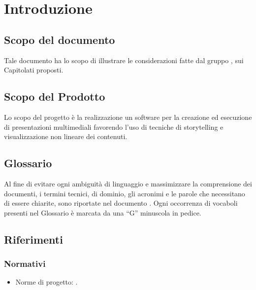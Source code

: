 \section{Introduzione}{
	\subsection{Scopo del documento}{
		Tale documento ha lo scopo di illustrare le considerazioni fatte dal gruppo \gruppo, sui Capitolati proposti.
	}
	\subsection{Scopo del Prodotto}{
		Lo scopo del progetto è la realizzazione un software per la creazione ed esecuzione di presentazioni multimediali favorendo l’uso di tecniche di storytelling e visualizzazione non lineare dei contenuti.
		}
	\subsection{Glossario}{
		Al fine di evitare ogni ambiguità di linguaggio e massimizzare la comprensione dei documenti, i termini tecnici, di dominio, gli acronimi e le parole che necessitano di essere chiarite, sono riportate nel documento \href{run:../../Esterni/\fGlossario}{\fEscapeGlossario}. Ogni occorrenza di vocaboli presenti nel Glossario è marcata da una “G” minuscola in pedice.
		}
	\subsection{Riferimenti}{
		\subsubsection{Normativi}{
			\begin{itemize}
				\item Norme di progetto: \href{run:../../Interni/\fNormeDiProgetto}{\fEscapeNormeDiProgetto}.
			\end{itemize}
			}
}}
